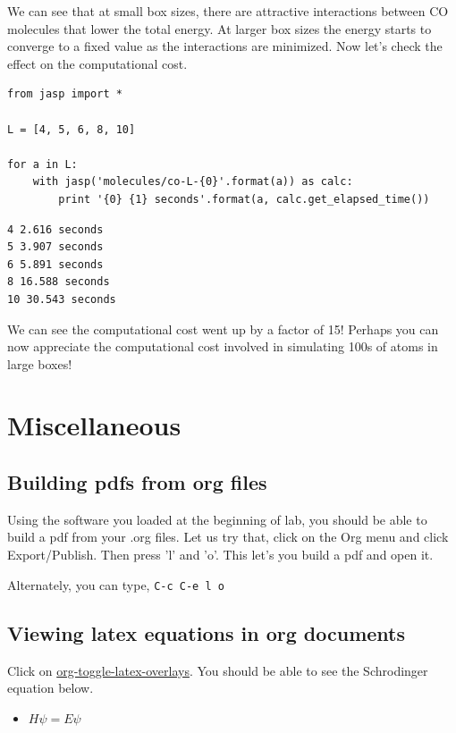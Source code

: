\documentclass[11pt]{article}
\begin{document}
We can see that at small box sizes, there are attractive interactions between CO molecules that lower the total energy. At larger box sizes the energy starts to converge to a fixed value as the interactions are minimized. Now let's check the effect on the computational cost.

\begin{verbatim}
from jasp import *

L = [4, 5, 6, 8, 10]

for a in L:
    with jasp('molecules/co-L-{0}'.format(a)) as calc:
        print '{0} {1} seconds'.format(a, calc.get_elapsed_time())
\end{verbatim}

\begin{verbatim}
4 2.616 seconds
5 3.907 seconds
6 5.891 seconds
8 16.588 seconds
10 30.543 seconds
\end{verbatim}

We can see the computational cost went up by a factor of 15! Perhaps you can now appreciate the computational cost involved in simulating 100s of atoms in large boxes!




\section{Miscellaneous}
\label{sec-8}

\subsection{Building pdfs from org files}
\label{sec-8-1}

Using the software you loaded at the beginning of lab, you should be able to build a pdf from your .org files. Let us try that, click on the Org menu and click Export/Publish. Then press 'l' and 'o'. This let's you build a pdf and open it.

Alternately, you can type, \verb~C-c C-e l o~


\subsection{Viewing latex equations in org documents}
\label{sec-8-2}

Click on \url{org-toggle-latex-overlays}. You should be able to see the Schrodinger equation below.

\begin{itemize}
\item $H\psi = E\psi$
\end{itemize}
\end{document}
